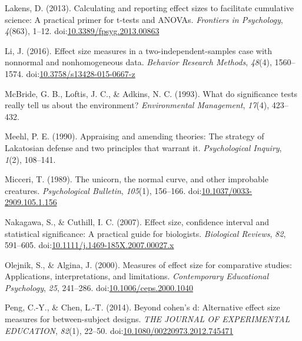 \documentclass[man]{apa6}
\begin{document}
\leavevmode\hypertarget{ref-Lakens_2013}{}%
Lakens, D. (2013). Calculating and reporting effect sizes to facilitate cumulative science: A practical primer for t-tests and ANOVAs. \emph{Frontiers in Psychology}, \emph{4}(863), 1--12. doi:\href{https://doi.org/10.3389/fpsyg.2013.00863}{10.3389/fpsyg.2013.00863}

\leavevmode\hypertarget{ref-Li_2016}{}%
Li, J. (2016). Effect size measures in a two-independent-samples case with nonnormal and nonhomogeneous data. \emph{Behavior Research Methods}, \emph{48}(4), 1560--1574. doi:\href{https://doi.org/10.3758/s13428-015-0667-z}{10.3758/s13428-015-0667-z}

\leavevmode\hypertarget{ref-McBride_et_al_1993}{}%
McBride, G. B., Loftis, J. C., \& Adkins, N. C. (1993). What do significance tests really tell us about the environment? \emph{Environmental Management}, \emph{17}(4), 423--432.

\leavevmode\hypertarget{ref-Meehl_1990}{}%
Meehl, P. E. (1990). Appraising and amending theories: The strategy of Lakatosian defense and two principles that warrant it. \emph{Psychological Inquiry}, \emph{1}(2), 108--141.

\leavevmode\hypertarget{ref-Micceri_1989}{}%
Micceri, T. (1989). The unicorn, the normal curve, and other improbable creatures. \emph{Psychological Bulletin}, \emph{105}(1), 156--166. doi:\href{https://doi.org/10.1037/0033-2909.105.1.156}{10.1037/0033-2909.105.1.156}

\leavevmode\hypertarget{ref-Nakagawa_and_Cuthill_2007}{}%
Nakagawa, S., \& Cuthill, I. C. (2007). Effect size, confidence interval and statistical significance: A practical guide for biologists. \emph{Biological Reviews}, \emph{82}, 591--605. doi:\href{https://doi.org/10.1111/j.1469-185X.2007.00027.x}{10.1111/j.1469-185X.2007.00027.x}

\leavevmode\hypertarget{ref-Olejnik_Algina_2000}{}%
Olejnik, S., \& Algina, J. (2000). Measures of effect size for comparative studies: Applications, interpretations, and limitations. \emph{Contemporary Educational Psychology}, \emph{25}, 241--286. doi:\href{https://doi.org/10.1006/ceps.2000.1040}{10.1006/ceps.2000.1040}

\leavevmode\hypertarget{ref-Peng_and_Chen_2014}{}%
Peng, C.-Y., \& Chen, L.-T. (2014). Beyond cohen's d: Alternative effect size measures for between-subject designs. \emph{THE JOURNAL OF EXPERIMENTAL EDUCATION}, \emph{82}(1), 22--50. doi:\href{https://doi.org/10.1080/00220973.2012.745471}{10.1080/00220973.2012.745471}
\end{document}
